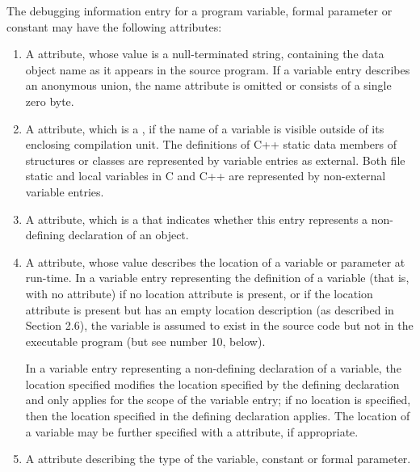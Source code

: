 The debugging information entry for a program variable,
formal parameter or constant may have the following attributes:
\begin{enumerate}[1.]
\item A  attribute, whose value is a null-terminated
string, containing the data object name as it appears in the
source program.  If a variable entry describes an anonymous
union, the name attribute is omitted or consists of a single
zero byte.

\item A  attribute, 
which is a , if the name
of a variable is visible outside of its enclosing compilation
unit.  The definitions of C++ static data members of structures
or classes are represented by variable entries  as
external. Both file static and local variables in C and C++
are represented by non-external variable entries.

\item A  attribute, 
which is a  that
indicates whether this entry represents a non-defining
declaration of an object.

\item A  attribute, whose value describes the
location of a variable or parameter at run-time.  In a variable
entry representing the definition of a variable (that is,
with no  attribute) if no location attribute
is present, or if the location attribute is present but has
an empty location description (as described in Section 2.6),
the variable is assumed to exist in the source code but not
in the executable program (but see number 10, below).

In a variable entry representing a non-defining declaration of a variable, the location
specified modifies the location specified by the defining declaration and only applies for the
scope of the variable entry; if no location is specified, then the location specified in the
defining declaration applies.
The location of a variable may be further specified with a  attribute, if
appropriate.

\item A  attribute describing the type of the variable,
constant or formal parameter.


\end{enumerate}
